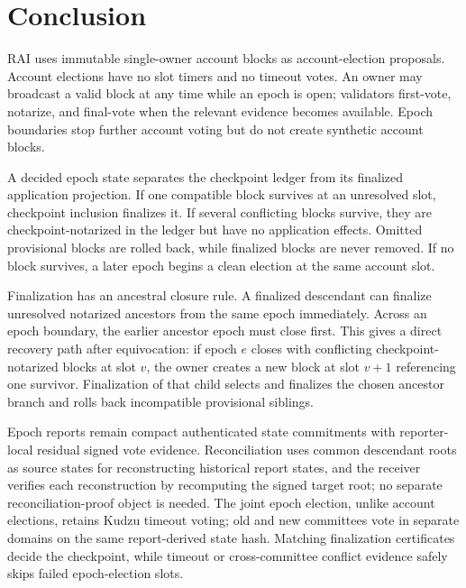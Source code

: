 \documentclass[10pt,twocolumn]{article}
\begin{document}
\begin{center}
\end{center}

\section{Conclusion}
RAI uses immutable single-owner account blocks as account-election proposals. Account elections have no slot timers and no timeout votes. An owner may broadcast a valid block at any time while an epoch is open; validators first-vote, notarize, and final-vote when the relevant evidence becomes available. Epoch boundaries stop further account voting but do not create synthetic account blocks.

A decided epoch state separates the checkpoint ledger from its finalized application projection. If one compatible block survives at an unresolved slot, checkpoint inclusion finalizes it. If several conflicting blocks survive, they are checkpoint-notarized in the ledger but have no application effects. Omitted provisional blocks are rolled back, while finalized blocks are never removed. If no block survives, a later epoch begins a clean election at the same account slot.

Finalization has an ancestral closure rule. A finalized descendant can finalize unresolved notarized ancestors from the same epoch immediately. Across an epoch boundary, the earlier ancestor epoch must close first. This gives a direct recovery path after equivocation: if epoch $e$ closes with conflicting checkpoint-notarized blocks at slot $v$, the owner creates a new block at slot $v+1$ referencing one survivor. Finalization of that child selects and finalizes the chosen ancestor branch and rolls back incompatible provisional siblings.

Epoch reports remain compact authenticated state commitments with reporter-local residual signed vote evidence. Reconciliation uses common descendant roots as source states for reconstructing historical report states, and the receiver verifies each reconstruction by recomputing the signed target root; no separate reconciliation-proof object is needed. The joint epoch election, unlike account elections, retains Kudzu timeout voting; old and new committees vote in separate domains on the same report-derived state hash. Matching finalization certificates decide the checkpoint, while timeout or cross-committee conflict evidence safely skips failed epoch-election slots.
\end{document}
